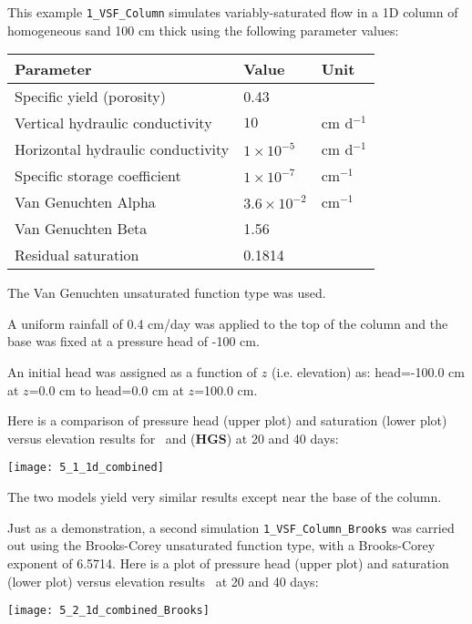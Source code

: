 \label{section:1d_column_example}
This example \texttt{1\_VSF\_Column} simulates variably-saturated flow in a 1D column of homogeneous sand 100 cm thick using the following  parameter values:

\begin{center}
    \begin{tabular}{lll}  \hline
        Parameter                               & Value & Unit                           \\ \hline
        Specific yield (porosity)               &  0.43                    &             \\
        Vertical hydraulic conductivity         &  $ 10$                   & cm d$^{-1}$  \\
        Horizontal hydraulic conductivity       &  $ 1 \times 10^{-5}$     & cm d$^{-1}$  \\
        Specific storage coefficient            &  $ 1 \times 10^{-7}$     & cm$^{-1}$   \\
        Van Genuchten Alpha                     &  $ 3.6 \times 10^{-2}$   & cm$^{-1}$     \\
        Van Genuchten Beta                      &  1.56                    &             \\
        Residual saturation                     &  0.1814                  &             \\
    \hline
    \end{tabular}
\end{center}

The Van Genuchten unsaturated function type was used.

A uniform rainfall of 0.4 cm/day was applied to the top of the column and the base was fixed at a pressure head of -100 cm.

An initial head was assigned as a function of $z$ (i.e. elevation) as: head=-100.0 cm at $z$=0.0 cm to head=0.0 cm at $z$=100.0 cm.

\pagebreak
Here is a comparison of pressure head (upper plot) and saturation (lower plot) versus elevation results for  \mfus\ and \hgs(\textbf{\sf HGS}) at 20 and 40 days:

\texttt{[image: 5\_1\_1d\_combined]}

The two models yield very similar results except near the base of the column.

    \pagebreak
Just as a demonstration, a second simulation \texttt{1\_VSF\_Column\_Brooks} was carried out using the   Brooks-Corey unsaturated function type,  with a Brooks-Corey exponent of 6.5714.  Here is a plot of pressure head (upper plot) and saturation (lower plot) versus elevation results  \mfus\ at 20 and 40 days:

\texttt{[image: 5\_2\_1d\_combined\_Brooks]}

